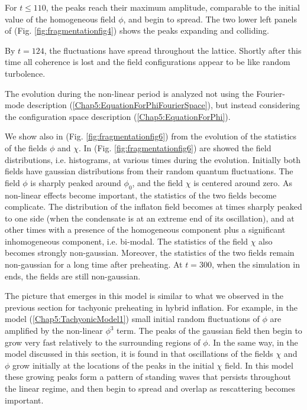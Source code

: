 \documentclass[11pt,a4paper,twoside]{book}
\begin{document}
For $ t \le 110 $, the peaks reach their maximum amplitude, comparable to the initial value of the homogeneous field $\phi$, and begin to spread. The two lower left panels of (Fig. \ref{fig:fragmentationfig4})  shows the peaks expanding and colliding.

By $ t=124 $, the fluctuations have spread throughout the lattice. Shortly after this time all coherence is lost and the field configurations appear to be like random turbolence.

The evolution during the non-linear period is analyzed not using the Fourier-mode description (\ref{Chap5:EquationForPhiFourierSpace}), but instead considering the configuration space description (\ref{Chap5:EquationForPhi}).

We show also in (Fig. \ref{fig:fragmentationfig6}) from \cite{Chap5:Fragmentation} the evolution of the statistics of the fields $\phi$ and $\chi$. In (Fig. \ref{fig:fragmentationfig6})  are showed the field distributions, i.e. histograms, at various times during the evolution. Initially both fields have gaussian distributions from their random quantum fluctuations. The field $\phi$ is sharply peaked around $\phi_{0}$, and the field $\chi$ is centered around zero. As non-linear effects become important, the statistics of the two fields become complicate. The distribution  of the inflaton field becomes at times sharply peaked to one side (when the condensate is at an extreme end of its oscillation), and at other times with a presence of the homogeneous component plus a significant inhomogeneous component, i.e. bi-modal. The statistics of the field $\chi$ also becomes strongly non-gaussian. Moreover, the statistics of the two fields remain non-gaussian for a long time after preheating. At $ t=300 $, when the simulation in \cite{Chap5:Fragmentation} ends, the fields are still non-gaussian.

The picture that emerges in this model is similar to what we observed in the previous section for tachyonic preheating in hybrid inflation.  For example, in the model (\ref{Chap5:TachyonicModel1}) small initial random fluctuations of $\phi$ are amplified by the non-linear $\phi^{3}$ term. The peaks of the gaussian field then begin to grow very fast relatively to the surrounding regions of $\phi$. In the same way, in the model discussed in this section, it is found in \cite{Chap5:Fragmentation} that oscillations of the fields $\chi$ and $\phi$ grow initially at the locations of the peaks in the initial $\chi$ field. In this model these growing peaks form a pattern of standing waves that persists throughout the linear regime, and then begin to spread and overlap as rescattering becomes important.
\end{document}
